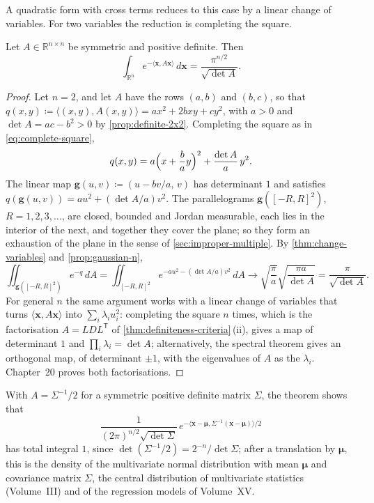 A quadratic form with cross terms reduces to this case by a linear change of variables. For two variables the reduction is completing the square.

\begin{theorem}
\label{thm:gaussian-quadratic}
Let $A\in\mathbb R^{n\times n}$ be symmetric and positive definite. Then
\[
\int_{\mathbb R^n}e^{-\langle\mathbf x,A\mathbf x\rangle}\,d\mathbf x=\frac{\pi^{n/2}}{\sqrt{\det A}} .
\]
\end{theorem}

\begin{proof}
Let $n=2$, and let $A$ have the rows $(a,b)$ and $(b,c)$, so that $q(x,y)\coloneqq\langle(x,y),A(x,y)\rangle=ax^2+2bxy+cy^2$, with $a>0$ and $\det A=ac-b^2>0$ by \cref{prop:definite-2x2}. Completing the square as in \eqref{eq:complete-square},
\[
q(x,y)=a\Bigl(x+\frac bay\Bigr)^2+\frac{\det A}a\,y^2 .
\]
The linear map $\mathbf g(u,v)\coloneqq(u-bv/a,\,v)$ has determinant $1$ and satisfies $q(\mathbf g(u,v))=au^2+(\det A/a)v^2$. The parallelograms $\mathbf g([-R,R]^2)$, $R=1,2,3,\ldots$, are closed, bounded and Jordan measurable, each lies in the interior of the next, and together they cover the plane; so they form an exhaustion of the plane in the sense of \cref{sec:improper-multiple}. By \cref{thm:change-variables} and \cref{prop:gaussian-n},
\[
\iint_{\mathbf g([-R,R]^2)}e^{-q}\,dA=\iint_{[-R,R]^2}e^{-au^2-(\det A/a)v^2}\,dA\to\sqrt{\frac\pi a}\sqrt{\frac{\pi a}{\det A}}=\frac\pi{\sqrt{\det A}} .
\]
For general $n$ the same argument works with a linear change of variables that turns $\langle\mathbf x,A\mathbf x\rangle$ into $\sum_i\lambda_iu_i^2$: completing the square $n$ times, which is the factorisation $A=LDL^{\mathsf T}$ of \cref{thm:definiteness-criteria}\,(ii), gives a map of determinant $1$ and $\prod_i\lambda_i=\det A$; alternatively, the spectral theorem gives an orthogonal map, of determinant $\pm1$, with the eigenvalues of $A$ as the $\lambda_i$. Chapter~20 proves both factorisations.
\end{proof}

With $A=\Sigma^{-1}/2$ for a symmetric positive definite matrix $\Sigma$, the theorem shows that
\[
\frac1{(2\pi)^{n/2}\sqrt{\det\Sigma}}\,e^{-\langle\mathbf x-\boldsymbol\mu,\Sigma^{-1}(\mathbf x-\boldsymbol\mu)\rangle/2}
\]
has total integral $1$, since $\det(\Sigma^{-1}/2)=2^{-n}/\det\Sigma$; after a translation by $\boldsymbol\mu$, this is the density of the multivariate normal distribution with mean $\boldsymbol\mu$ and covariance matrix $\Sigma$, the central distribution of multivariate statistics (Volume~III) and of the regression models of Volume~XV.

